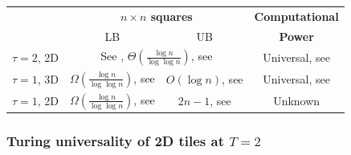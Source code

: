 	\begin{center}
	\begin{tabular}{|| c || c | c | c ||}
		\hline\hline
		~ & \multicolumn{2}{c|}{\bf $n\times n$ squares} & {\bf Computational} \\
		~ & \multicolumn{1}{c}{LB} & \multicolumn{1}{c|}{UB} & {\bf Power}\\
		\hline
		$\tau=2$, 2D & \multicolumn{2}{c|}{See \cite{square_lb}, $\Theta(\frac{\log n}{\log\log n})$, see \cite{square_ub}} & Universal, see \cite{winfree_phd} \\
		\hline
		$\tau=1$, 3D & $\Omega(\frac{\log n}{\log\log n})$, see \cite{square_lb} & $O(\log n)$, see \cite{cook_temp1} & Universal, see \cite{cook_temp1} \\
		\hline
		$\tau=1$, 2D & $\Omega(\frac{\log n}{\log\log n})$, see \cite{square_lb} & $2n-1$, see \cite{square_lb} & Unknown \\
		\hline\hline
	\end{tabular}
	\end{center}
	
	\subsubsection{Turing universality of 2D tiles at $T=2$}
		
		
